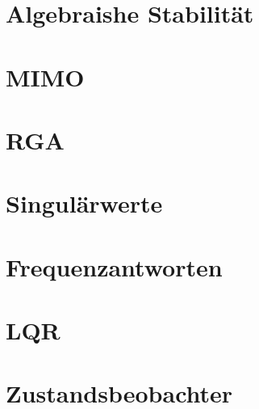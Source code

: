 \begin{multicols*}{3}
\vfill\null\columnbreak
\section{Algebraishe Stabilität}
    
    

\vfill\null\columnbreak 
\section{MIMO}
    
    
    

\vfill\null\columnbreak 
\section{RGA}
    

\vfill\null\columnbreak 
\section{Singulärwerte}
    
  
\vfill\null\columnbreak  
\section{Frequenzantworten}
    
    
    
    
\vfill\null\columnbreak
\section{LQR}
    
    
    
    
    
    
    
\vfill\null\columnbreak
\section{Zustandsbeobachter}
    
    
    
\vfill\null\columnbreak

\end{multicols*}
